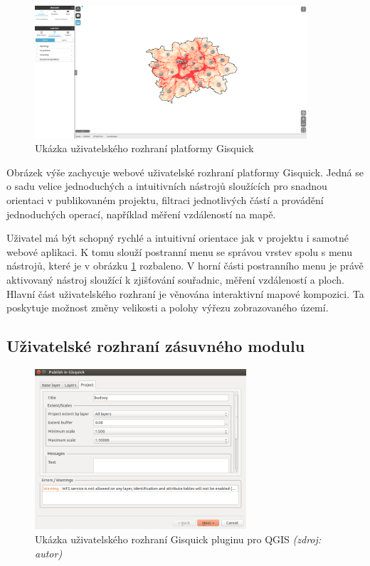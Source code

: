\begin{figure}[h!]
\centering
\includegraphics[width=0.9\textwidth]{./img/gisquick_ui.png}
\caption{Ukázka uživatelského rozhraní platformy
Gisquick\cite{gisquick-prague}}
\label{fig:gisquick-prague}
\end{figure}

Obrázek výše zachycuje webové uživatelské rozhraní platformy
Gisquick. Jedná se o sadu velice jednoduchých a intuitivních nástrojů
sloužících pro snadnou orientaci v publikovaném projektu, filtraci
jednotlivých částí a provádění jednoduchých operací, například
měření vzdáleností na mapě.

Uživatel má být schopný rychlé a intuitivní orientace jak v projektu i 
samotné webové aplikaci. K tomu slouží postranní menu se správou
vrstev spolu s menu nástrojů, které je v obrázku \ref{fig:gisquick-prague}
rozbaleno. V horní části postranního menu je právě aktivovaný
nástroj sloužící k zjišťování souřadnic, měření vzdáleností
a ploch. Hlavní část uživatelského rozhraní je věnována interaktivní mapové kompozici. Ta
poskytuje možnost změny velikosti a polohy výřezu zobrazovaného území.

\newpage
\subsection{Uživatelské rozhraní zásuvného modulu}

\begin{figure}[h!]
	\centering
	\includegraphics[width=0.7\textwidth]{./img/gisquick_plugin.png}
	\caption{Ukázka uživatelského rozhraní Gisquick pluginu pro QGIS \textit{(zdroj: autor)}}
	\label{fig:gisquick-plugin}
\end{figure}

